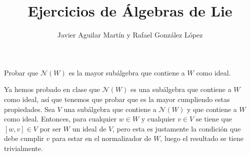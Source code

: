 \documentclass[twoside]{article}
\begin{document}
\title{Ejercicios de Álgebras de Lie}
\author{Javier Aguilar Martín y Rafael González López}
\maketitle

\begin{ejercicio}{1}
	Probar que $\mathcal{N}(W)$ es la mayor subálgebra que contiene a $W$ como ideal.
\end{ejercicio}
\begin{solucion}
		Ya hemos probado en clase que $\mathcal{N}(W)$ es una subálgebra que contiene a $W$ como ideal, así que tenemos que probar que es la mayor cumpliendo estas propiedades. Sea $V$ una subálgebra que contiene a $\mathcal{N}(W)$ y que contiene a $W$ como ideal. Entonces, para cualquier $w\in W$ y cualquier $v\in V$ se tiene que $[w,v]\in V$ por ser $W$ un ideal de $V$, pero esta es justamente la condición que debe cumplir $v$ para estar en el normalizador de $W$, luego el resultado se tiene trivialmente. 
	\end{solucion}
\newpage
\end{document}
